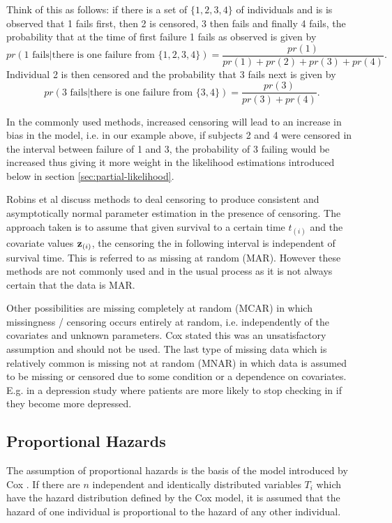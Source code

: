Think of this as follows: if there is a set of $\{1,2,3,4\}$ of individuals and is is observed that 1 fails first, then 2 is censored, 3 then fails and finally 4 fails, the probability that at the time of first failure 1 fails as observed is given by $$pr(1\textrm{ fails}|\textrm{there is one failure from }\{1,2,3,4\})=\frac{pr(1)}{pr(1)+pr(2)+pr(3)+pr(4)}.$$ Individual 2 is then censored and the probability that 3 fails next is given by $$pr(3\textrm{ fails}|\textrm{there is one failure from }\{3,4\})=\frac{pr(3)}{pr(3)+pr(4)}.$$

In the commonly used methods, increased censoring will lead to an increase in bias in the model, i.e. in our example above, if subjects 2 and 4 were censored in the interval between failure of 1 and 3, the probability of 3 failing would be increased thus giving it more weight in the likelihood estimations introduced below in section \cref{sec:partial-likelihood}.

Robins et al  discuss methods to deal censoring to produce consistent and asymptotically normal parameter estimation in the presence of censoring. The approach taken is to assume that given survival to a certain time $t_{(i)}$ and the covariate values $\textbf{z}_{(i)}$, the censoring the in following interval is independent of survival time. This is referred to as  missing at random (MAR). However these methods are not commonly used and in the usual process as it is not always certain that the data is MAR.

Other possibilities are missing completely at random (MCAR) in which missingness / censoring occurs entirely at random, i.e. independently of the covariates and unknown parameters. Cox  stated this was an unsatisfactory assumption and should not be used. The last type of missing data which is relatively common is missing not at random (MNAR) in which data is assumed to be missing or censored due to some condition or a dependence on covariates. E.g. in a depression study where patients are more likely to stop checking in if they become more depressed.

\subsection{Proportional Hazards}

The assumption of proportional hazards is the basis of the model introduced by Cox . If there are $n$ independent and identically distributed variables $T_i$ which have the hazard distribution defined by the Cox model, it is assumed that the hazard of one individual is proportional to the hazard of any other individual.

